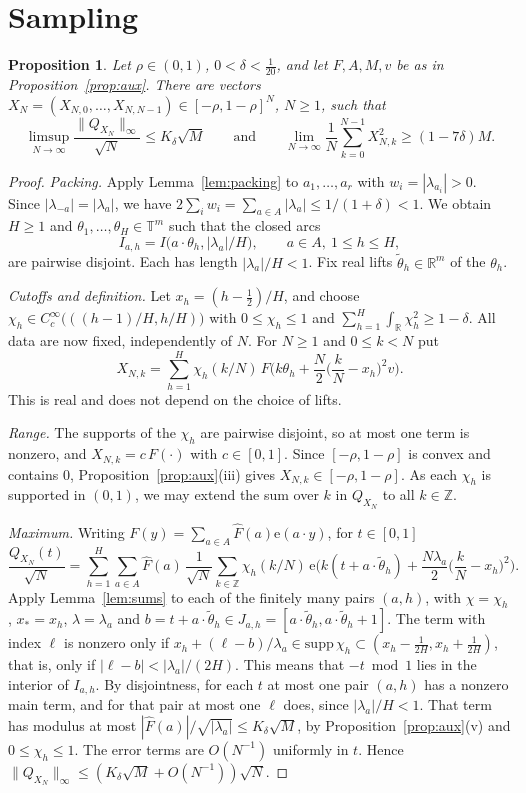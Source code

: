 \documentclass[11pt,reqno]{amsart}
\newtheorem{proposition}[theorem]{Proposition}
\theoremstyle{definition}
\newcommand{\T}{\mathbb{T}}
\newcommand{\Z}{\mathbb{Z}}
\newcommand{\R}{\mathbb{R}}
\newcommand{\e}{\mathrm{e}}
\begin{document}
\section{Sampling}\label{sec:sampling}

\begin{proposition}\label{prop:sampling}
Let $\rho\in(0,1)$, $0<\delta<\frac1{20}$, and let $F,A,M,v$ be as in Proposition~\ref{prop:aux}. There are vectors $X_N=(X_{N,0},\dots,X_{N,N-1})\in[-\rho,1-\rho]^N$, $N\ge1$, such that
\[
\limsup_{N\to\infty}\frac{\|Q_{X_N}\|_\infty}{\sqrt N}\le K_\delta\sqrt M\qquad\text{and}\qquad\lim_{N\to\infty}\frac1N\sum_{k=0}^{N-1}X_{N,k}^2\ge(1-7\delta)M .
\]
\end{proposition}

\begin{proof}
\emph{Packing.} Apply Lemma~\ref{lem:packing} to $a_1,\dots,a_r$ with $w_i=|\lambda_{a_i}|>0$. Since $|\lambda_{-a}|=|\lambda_a|$, we have $2\sum_iw_i=\sum_{a\in A}|\lambda_a|\le1/(1+\delta)<1$. We obtain $H\ge1$ and $\theta_1,\dots,\theta_H\in\T^m$ such that the closed arcs
\[
I_{a,h}=I\big(a\cdot\theta_h,|\lambda_a|/H\big),\qquad a\in A,\ 1\le h\le H,
\]
are pairwise disjoint. Each has length $|\lambda_a|/H<1$. Fix real lifts $\tilde\theta_h\in\R^m$ of the $\theta_h$.

\emph{Cutoffs and definition.} Let $x_h=(h-\frac12)/H$, and choose $\chi_h\in C_c^\infty\big(((h-1)/H,h/H)\big)$ with $0\le\chi_h\le1$ and $\sum_{h=1}^H\int_\R\chi_h^2\ge1-\delta$. All data are now fixed, independently of $N$. For $N\ge1$ and $0\le k<N$ put
\[
X_{N,k}=\sum_{h=1}^H\chi_h(k/N)\,F\Big(k\theta_h+\frac N2\Big(\frac kN-x_h\Big)^2v\Big).
\]
This is real and does not depend on the choice of lifts.

\emph{Range.} The supports of the $\chi_h$ are pairwise disjoint, so at most one term is nonzero, and $X_{N,k}=c\,F(\cdot)$ with $c\in[0,1]$. Since $[-\rho,1-\rho]$ is convex and contains $0$, Proposition~\ref{prop:aux}(iii) gives $X_{N,k}\in[-\rho,1-\rho]$. As each $\chi_h$ is supported in $(0,1)$, we may extend the sum over $k$ in $Q_{X_N}$ to all $k\in\Z$.

\emph{Maximum.} Writing $F(y)=\sum_{a\in A}\widehat F(a)\e(a\cdot y)$, for $t\in[0,1]$
\[
\frac{Q_{X_N}(t)}{\sqrt N}=\sum_{h=1}^H\sum_{a\in A}\widehat F(a)\,\frac1{\sqrt N}\sum_{k\in\Z}\chi_h(k/N)\,\e\Big(k(t+a\cdot\tilde\theta_h)+\frac{N\lambda_a}2\Big(\frac kN-x_h\Big)^2\Big).
\]
Apply Lemma~\ref{lem:sums} to each of the finitely many pairs $(a,h)$, with $\chi=\chi_h$, $x_*=x_h$, $\lambda=\lambda_a$ and $b=t+a\cdot\tilde\theta_h\in J_{a,h}=[a\cdot\tilde\theta_h,a\cdot\tilde\theta_h+1]$. The term with index $\ell$ is nonzero only if $x_h+(\ell-b)/\lambda_a\in\mathrm{supp}\,\chi_h\subset(x_h-\frac1{2H},x_h+\frac1{2H})$, that is, only if $|\ell-b|<|\lambda_a|/(2H)$. This means that $-t\bmod1$ lies in the interior of $I_{a,h}$. By disjointness, for each $t$ at most one pair $(a,h)$ has a nonzero main term, and for that pair at most one $\ell$ does, since $|\lambda_a|/H<1$. That term has modulus at most $|\widehat F(a)|/\sqrt{|\lambda_a|}\le K_\delta\sqrt M$, by Proposition~\ref{prop:aux}(v) and $0\le\chi_h\le1$. The error terms are $O(N^{-1})$ uniformly in $t$. Hence $\|Q_{X_N}\|_\infty\le(K_\delta\sqrt M+O(N^{-1}))\sqrt N$.


\end{proof}
\end{document}
